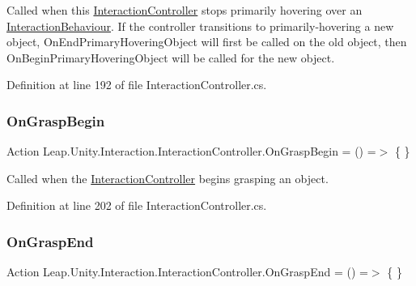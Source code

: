 Called when this \mbox{\hyperlink{class_leap_1_1_unity_1_1_interaction_1_1_interaction_controller}{Interaction\+Controller}} stops primarily hovering over an \mbox{\hyperlink{class_leap_1_1_unity_1_1_interaction_1_1_interaction_behaviour}{Interaction\+Behaviour}}. If the controller transitions to primarily-\/hovering a new object, On\+End\+Primary\+Hovering\+Object will first be called on the old object, then On\+Begin\+Primary\+Hovering\+Object will be called for the new object. 



Definition at line 192 of file Interaction\+Controller.\+cs.

\mbox{\label{class_leap_1_1_unity_1_1_interaction_1_1_interaction_controller_ac6f8d116e41ed7b2dadd1dcad335a3a2}} 
\subsubsection{\texorpdfstring{OnGraspBegin}{OnGraspBegin}}
{\footnotesize\ttfamily Action Leap.\+Unity.\+Interaction.\+Interaction\+Controller.\+On\+Grasp\+Begin = () =$>$ \{ \}}



Called when the \mbox{\hyperlink{class_leap_1_1_unity_1_1_interaction_1_1_interaction_controller}{Interaction\+Controller}} begins grasping an object. 



Definition at line 202 of file Interaction\+Controller.\+cs.

\mbox{\label{class_leap_1_1_unity_1_1_interaction_1_1_interaction_controller_a1ff810c665a33a222e7d736ac224d839}} 
\subsubsection{\texorpdfstring{OnGraspEnd}{OnGraspEnd}}
{\footnotesize\ttfamily Action Leap.\+Unity.\+Interaction.\+Interaction\+Controller.\+On\+Grasp\+End = () =$>$ \{ \}}




